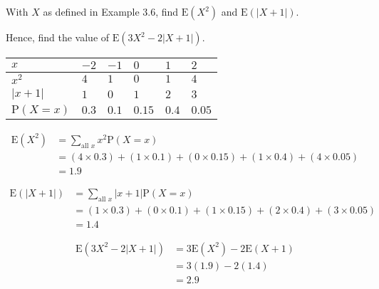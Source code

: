 \documentclass[11pt,a4paper]{book}
\begin{document}
\medskip

\begin{example}[Expectation of $g(X)$]

With $X$ as defined in \textsf{Example 3.6}, find $\text{E}\left(X^{2}\right)$
and $\text{E}\left(\left|X+1\right|\right)$.

Hence, find the value of $\text{E}\left(3X^{2}-2\left|X+1\right|\right)$.

\Solution

\begin{center}
\setlength{\extrarowheight}{2pt}%
\begin{tabular}[t]{|>{\centering}m{2cm}|>{\centering}m{1.5cm}|>{\centering}m{1.5cm}|>{\centering}m{1.5cm}|>{\centering}m{1.5cm}|>{\centering}m{1.5cm}|}
\hline
$x$ & $-2$ & $-1$ & $0$ & $1$ & $2$\tabularnewline
\hline
$x^{2}$ & $4$ & $1$ & $0$ & $1$ & $4$\tabularnewline
\hline
$\left|x+1\right|$ & $1$ & $0$ & $1$ & $2$ & $3$\tabularnewline
\hline
$\text{P}\left(X=x\right)$ & $0.3$ & $0.1$ & $0.15$ & $0.4$ & $0.05$\tabularnewline
\hline
\end{tabular}
\par\end{center}

\begin{align*}
\text{E}\left(X^{2}\right) & =\sum_{\text{all }x}x^{2}\text{P}\left(X=x\right)\\
 & =\left(4\times0.3\right)+\left(1\times0.1\right)+\left(0\times0.15\right)+\left(1\times0.4\right)+\left(4\times0.05\right)\\
 & =1.9
\end{align*}

\begin{align*}
\text{E}\left(\left|X+1\right|\right) & =\sum_{\text{all }x}\left|x+1\right|\text{P}\left(X=x\right)\\
 & =\left(1\times0.3\right)+\left(0\times0.1\right)+\left(1\times0.15\right)+\left(2\times0.4\right)+\left(3\times0.05\right)\\
 & =1.4
\end{align*}


\begin{align*}
\text{E}\left(3X^{2}-2\left|X+1\right|\right) & =3\text{E}\left(X^{2}\right)-2\text{E}\left(X+1\right)\\
 & =3\left(1.9\right)-2\left(1.4\right)\\
 & =2.9
\end{align*}
\end{example}
\end{document}
